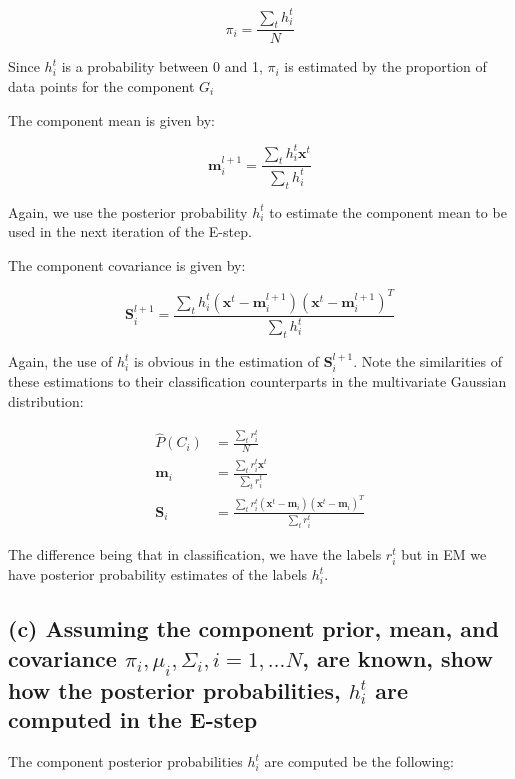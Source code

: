 \documentclass{article}
\begin{document}
\begin{equation}
\pi_i = \frac{\sum_t h_i^t}{N}
\end{equation}

Since $h_i^t$ is a probability between 0 and 1, $\pi_i$ is estimated by the proportion of data points for the component $G_i$

The component mean is given by:

\begin{equation}
\mathbf{m}_i^{l+1} = \frac{\sum_t h_i^t \mathbf{x}^t}{\sum_t h_i^t}
\end{equation}

Again, we use the posterior probability $h_i^t$ to estimate the component mean to be used in the next iteration of the E-step.

The component covariance is given by:

\begin{equation}
\mathbf{S}_i^{l+1} = \frac{\sum_t h_i^t (\mathbf{x}^t - \mathbf{m}_i^{l+1}) (\mathbf{x}^t - \mathbf{m}_i^{l+1})^T }{\sum_t h_i^t}
\end{equation}

Again, the use of $h_i^t$ is obvious in the estimation of $\mathbf{S}_i^{l + 1}$.  Note the similarities of these estimations to their classification counterparts in the multivariate Gaussian distribution:

\begin{equation}
\begin{aligned}
\hat{P} ( C_i ) &= \frac{ \sum_t r_i^t }{ N } \\
\mathbf{m}_i &= \frac{ \sum_t r_i^t \mathbf{x}^t }{ \sum_t r_i^t } \\
\mathbf{S}_i &= \frac{ \sum_t r_i^t ( \mathbf{x}^t - \mathbf{m}_i) ( \mathbf{x}^t - \mathbf{m}_i)^T }{ \sum_t r_i^t }
\end{aligned}
\end{equation}

The difference being that in classification, we have the labels $r_i^t$ but in EM we have posterior probability estimates of the labels $h_i^t$.

\subsection{(c) Assuming the component prior, mean, and covariance $\pi_i, \mu_i, \Sigma_i, i = 1, \dots N$, are known, show how the posterior probabilities, $h_i^t$ are computed in the E-step}

The component posterior probabilities $h_i^t$  are computed be the following:
\end{document}
